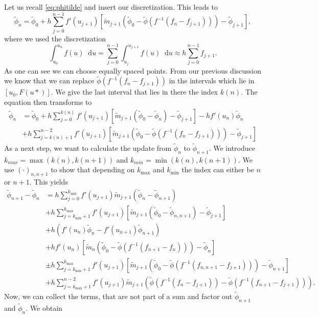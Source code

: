 \documentclass[12pt,a4paper,twoside, open=right]{scrreprt}
\theoremstyle{definition}
\theoremstyle{plain}
\newcommand{\tpne}{\tilde\phi_{n+1}}
\newcommand{\tpn}{\tilde\phi_{n}}
\newcommand{\D}{\mathop{}\!\mathrm{d}}
\begin{document}
\par 
Let us recall \eqref{eq:phitilde} and insert our discretization. This leads to
\begin{equation}
    \tilde\phi_n = \tilde\phi_0 +h\sum_{j=0}^{n-1}f'(u_{j+1})[\tilde{m}_{j+1}(\tilde\phi_0-\tilde\phi(f^{-1}(f_n-f_{j+1})))-\tilde\phi_{j+1}],
\end{equation}
where we used the discretization
\begin{equation}
    \int_{u_0}^{u_n}f(u)\D u=\sum_{j=0}^{n-1}\int_{u_j}^{u_{j+1}}f(u)\D u\approx h\sum_{j=0}^{n-1}f_{j+1}.
\end{equation}
As one can see we can choose equally spaced points. From our previous discussion we know that we can replace $\tilde\phi(f^{-1}(f_n-f_{j+1}))$ in the intervals which lie in $[u_0,F(u*)]$. We give the last interval that lies in there the index $k(n)$. The equation then transforms to 
\begin{align}
    \tilde\phi_n&=\tilde\phi_0+h\sum_{j=0}^{k(n)}f'(u_{j+1})[\tilde{m}_{j+1}(\tilde\phi_0-\tilde\phi_n)-\tilde\phi_{j+1}]-hf'(u_n)\tilde\phi_n\nonumber\\
    &+h\sum_{j=k(n)+1}^{n-2}f'(u_{j+1})[\tilde{m}_{j+1}(\tilde\phi_0-\tilde\phi(f^{-1}(f_n-f_{j+1})))-\tilde\phi_{j+1}]
\end{align}
As a next step, we want to calculate the update from $\tilde\phi_n$ to $\tilde\phi_{n+1}$. We introduce $k_{max}=\max(k(n),k(n+1))$ and $k_{min}=\min(k(n),k(n+1))$. We use $(\cdot)_{n,n+1}$ to show that depending on $k_{\max}$ and $k_{\min}$ the index can either be $n$ or $n+1$. This yields
\begin{align}
    \tpne-\tpn&=h\sum_{j=0}^{k_{\min}}f'(u_{j+1})\tilde{m}_{j+1}(\tpn-\tpne)\\
    &+h\sum_{j=k_{\min} +1}^{k_{\max}}f'(u_{j+1})[\tilde{m}_{j+1}(\tilde\phi_0-\tilde\phi_{n,n+1})-\tilde\phi_{j+1}]\\
    &+h(f'(u_n)\tpn-f'(u_{n+1})\tpne)\\
    &+hf'(u_n)[\tilde{m}_n(\tilde\phi_0-\tilde\phi(f^{-1}(f_{n+1}-f_n)))-\tpn]\\
    &\pm h\sum_{j=k_{\min}+1}^{k_{\max}}f'(u_{j+1})[\tilde{m}_{j+1}(\tilde\phi_0-\tilde\phi(f^{-1}(f_{n,n+1}-f_{j+1})))-\tpne]\\
    &+h\sum_{j=k_{\max}+1}^{n-2}f'(u_{j+1})\tilde{m}_{j+1}(\tilde\phi(f^{-1}(f_n-f_{j+1}))-\tilde\phi(f^{-1}(f_{n+1}-f_{j+1}))).
\end{align}
Now, we can collect the terms, that are not part of a sum and factor out $\tpne$ and $\tpn$. We obtain
\end{document}
